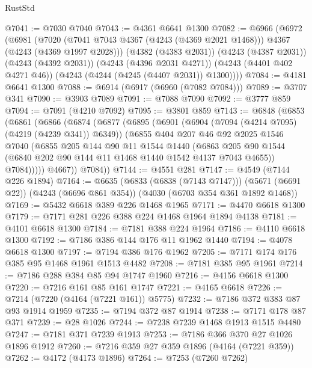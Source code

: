 \begin{lexlean}{RustStd}
\begin{coremodule}
@7041 := @7030 @7040
@7043 := @4361 @6641 @1300
@7082 := @6966
    (@6972
      (@6981
        (@7020 (@7041 @7043 @4367 (@4243 (@4369 @2021 @1468))) @4367 (@4243 (@4369 @1997 @2028)))
        (@4382 (@4383 @2031))
        (@4243 (@4387 @2031))
        (@4243 (@4392 @2031))
        (@4243 (@4396 @2031 @4271))
        (@4243 (@4401 @402 @4271 @46))
        (@4243 (@4244 (@4245 (@4407 @2031)) @1300))))
@7084 := @4181 @6641 @1300
@7088 := @6914 (@6917 (@6960 (@7082 @7084)))
@7089 := @3707 @341
@7090 := @3903 @7089
@7091 := @7088 @7090
@7092 := @3777 @859
@7094 := @7091 (@4210 @7092)
@7095 := @3801 @859
@7143 := @6848
    (@6853
      (@6861
        (@6866
          (@6874
            (@6877
              (@6895
                (@6901
                  (@6904 (@7094 (@4214 @7095) (@4219 (@4239 @341)) @6349))
                  (@6855
                    @404
                    @207
                    @46
                    @92
                    @2025
                    @1546
                    @7040
                    (@6855
                      @205
                      @144
                      @90
                      @11
                      @1544
                      @1440
                      (@6863
                        @205
                        @90
                        @1544
                        (@6840 @202 @90 @144 @11 @1468 @1440 @1542 @4137 @7043 @4655))
                      @7084)))))
            @4667))
        @7084))
@7144 := @4551 @281
@7147 := @4549 (@7144 @226 @1894)
@7164 := @6635
    (@6833 (@6838 (@7143 @7147)))
    (@5671 (@6691 @22))
    (@4243 (@6696 @861 @354))
    (@4030 (@6703 @354 @361 @1892 @1468))
@7169 := @5432 @6618 @389 @226 @1468 @1965
@7171 := @4470 @6618 @1300
@7179 := @7171 @281 @226 @388 @224 @1468 @1964 @1894 @4138
@7181 := @4101 @6618 @1300
@7184 := @7181 @388 @224 @1964
@7186 := @4110 @6618 @1300
@7192 := @7186 @386 @144 @176 @11 @1962 @1440
@7194 := @4078 @6618 @1300
@7197 := @7194 @386 @176 @1962
@7205 := @7171 @174 @176 @385 @95 @1468 @1961 @1513 @4482
@7208 := @7181 @385 @95 @1961
@7214 := @7186 @288 @384 @85 @94 @1747 @1960
@7216 := @4156 @6618 @1300
@7220 := @7216 @161 @85 @161 @1747
@7221 := @4165 @6618
@7226 := @7214 (@7220 (@4164 (@7221 @161)) @5775)
@7232 := @7186 @372 @383 @87 @93 @1914 @1959
@7235 := @7194 @372 @87 @1914
@7238 := @7171 @178 @87 @371
@7239 := @28 @1026
@7244 := @7238 @7239 @1468 @1913 @1515 @4480
@7247 := @7181 @371 @7239 @1913
@7253 := @7186 @366 @370 @27 @1026 @1896 @1912
@7260 := @7216 @359 @27 @359 @1896 (@4164 (@7221 @359))
@7262 := @4172 (@4173 @1896)
@7264 := @7253 (@7260 @7262)

\end{coremodule}
\end{lexlean}
